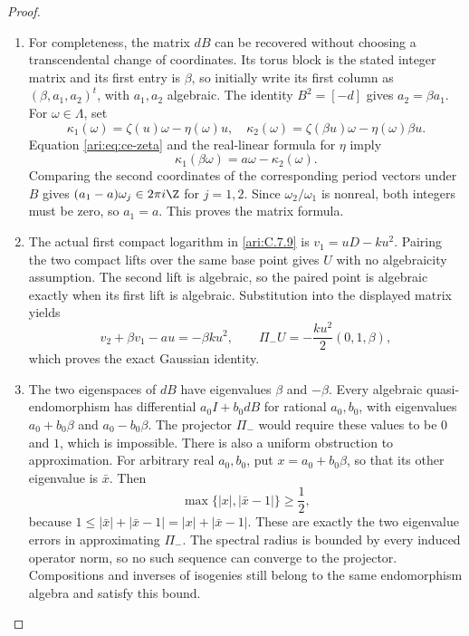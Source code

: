 \begin{proof}
\begin{enumerate}[label=\arabic*.,leftmargin=*]
\item For completeness, the matrix $dB$ can be recovered without
choosing a transcendental change of coordinates. Its torus
block is the stated integer matrix and its first entry is
$\beta$, so initially write its first column as
$(\beta,a_1,a_2)^t$, with $a_1,a_2$ algebraic.
The identity $B^2=[-d]$ gives $a_2=\beta a_1$.
For $\omega\in\Lambda$, set
\[
 \kappa_1(\omega)=\zeta(u)\omega-\eta(\omega)u,
 \quad
 \kappa_2(\omega)=\zeta(\beta u)\omega-\eta(\omega)\beta u.
\]
Equation \eqref{ari:eq:ce-zeta} and the real-linear formula for
$\eta$ imply
\[
 \kappa_1(\beta\omega)=a\omega-\kappa_2(\omega).
\]
Comparing the second coordinates of the corresponding period
vectors under $B$ gives
$(a_1-a)\omega_j\in2\pi i\Z$ for $j=1,2$.
Since $\omega_2/\omega_1$ is nonreal, both integers must
be zero, so $a_1=a$. This proves the matrix formula.

\item The actual first compact logarithm in \ref{ari:C.7.9} is
$v_1=uD-ku^2$. Pairing the two compact lifts over the same base
point gives $U$ with no algebraicity assumption. The second lift
is algebraic, so the paired point is algebraic exactly when its
first lift is algebraic.
Substitution into the displayed matrix yields
\[
 v_2+\beta v_1-au=-\beta ku^2,
 \qquad
 \Pi_-U=-\frac{ku^2}{2}(0,1,\beta),
\]
which proves the exact Gaussian identity.

\item The two eigenspaces of $dB$ have eigenvalues $\beta$ and
$-\beta$. Every algebraic quasi-endomorphism has differential
$a_0I+b_0dB$ for rational $a_0,b_0$, with eigenvalues
$a_0+b_0\beta$ and $a_0-b_0\beta$. The projector
$\Pi_-$ would require these values to be $0$ and $1$,
which is impossible. There is also a uniform obstruction to
approximation. For arbitrary real $a_0,b_0$, put
$x=a_0+b_0\beta$, so that its other eigenvalue is
$\bar x$. Then
\begin{equation}\label{ari:eq:ce-gap}
 \max\{|x|,|\bar x-1|\}\ge\frac12,
\end{equation}
because $1\le|\bar x|+|\bar x-1|=|x|+|\bar x-1|$.
These are exactly the two eigenvalue errors in approximating
$\Pi_-$. The spectral radius is bounded by every induced
operator norm, so no such sequence can converge to the
projector. Compositions and inverses of isogenies still belong
to the same endomorphism algebra and satisfy this bound.


\end{enumerate}
\end{proof}
